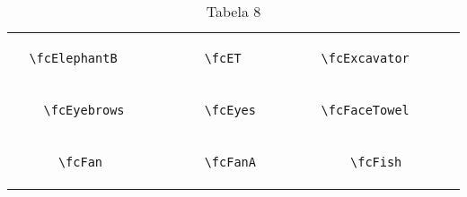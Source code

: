 \documentclass[x11names]{article}
\begin{document}
\begin{table}[H]
\begin{tabular}{|c|c|c|c|c|c|}
		&\multirow{5}{*}{	\fcElephantB	[scale=0.4]} & &\multirow{5}{*}{	\fcET	[scale=0.4]} & &\multirow{5}{*}{	\fcExcavator	[scale=0.3]}\\	& & & & & \\	& & & & & \\	\verb|	\fcElephantB	| & & \verb|	\fcET	| & & \verb|	\fcExcavator	| & \\	& & & & & \\	& & & & & \\	& & & & & \\	\hline									
		&\multirow{5}{*}{	\fcEyebrows	[scale=0.4]} & &\multirow{5}{*}{	\fcEyes	[scale=0.4]} & &\multirow{5}{*}{	\fcFaceTowel	[scale=0.3]}\\	& & & & & \\	& & & & & \\	\verb|	\fcEyebrows	| & & \verb|	\fcEyes	| & & \verb|	\fcFaceTowel	| & \\	& & & & & \\	& & & & & \\	& & & & & \\	\hline									
		&\multirow{5}{*}{	\fcFan	[scale=0.8]} & &\multirow{5}{*}{	\fcFanA	[scale=0.3]} & &\multirow{5}{*}{	\fcFish	[scale=0.8]}\\	& & & & & \\	& & & & & \\	\verb|	\fcFan	| & & \verb|	\fcFanA	| & & \verb|	\fcFish	| & \\	& & & & & \\	& & & & & \\	& & & & & \\		\hline 	\hline 	\end{tabular}	\caption{	Tabela 8	}\label{	Tab8	}\end{table}
\end{document}
